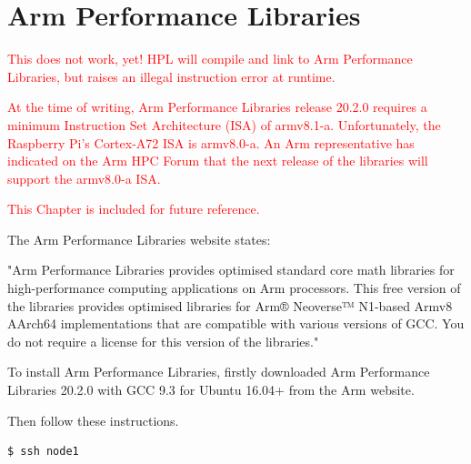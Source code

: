 \documentclass{report}
\begin{document}







%
%

\chapter{Arm Performance Libraries}

\textcolor{red}{This does not work, yet! HPL will compile and link to Arm Performance Libraries, but raises an illegal instruction error at runtime.}

\textcolor{red}{At the time of writing, Arm Performance Libraries release 20.2.0 requires a minimum Instruction Set Architecture (ISA) of armv8.1-a. Unfortunately, the Raspberry Pi's Cortex-A72 ISA is armv8.0-a. An Arm representative has indicated on the Arm HPC Forum that the next release of the libraries will support the armv8.0-a ISA.}

\textcolor{red}{This Chapter is included for future reference.}

The Arm Performance Libraries website states:

"Arm Performance Libraries provides optimised standard core math libraries for high-performance computing applications on Arm processors. This free version of the libraries provides optimised libraries for Arm® Neoverse™ N1-based Armv8 AArch64 implementations that are compatible with various versions of GCC. You do not require a license for this version of the libraries."

To install Arm Performance Libraries, firstly downloaded Arm Performance Libraries 20.2.0 with GCC 9.3 for Ubuntu 16.04+ from the Arm website.

Then follow these instructions.

\lstset{style=type}
\begin{lstlisting}
$ ssh node1
\end{lstlisting}
\end{document}
